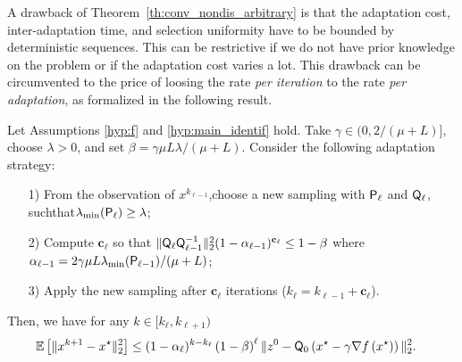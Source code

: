 {
A drawback of Theorem~\ref{th:conv_nondis_arbitrary} is that the adaptation cost, inter-adaptation time, and selection uniformity have to be bounded by deterministic sequences. This can be restrictive if we do not have prior knowledge on the problem or if the adaptation cost varies a lot. 
This drawback can be circumvented to the price of loosing the rate \emph{per iteration} to the rate \emph{per adaptation}, as formalized in the following result.
        

\begin{theorem}\label{th:aggressive}
    Let Assumptions \ref{hyp:f} and  \ref{hyp:main_identif} hold. Take $\gamma\in(0,2/(\mu+L)]$, choose $\lambda>0$, and set $\beta = \gamma\mu L\lambda/(\mu+L)$. Consider the following adaptation strategy:
    \begin{itemize}
        \item[1)] From the observation of $x^{k_{\ell-1}}$\!,\;choose a new sampling with ${\mathsf{P}}_{\ell}$ and ${\mathsf{Q}}_\ell$,\,such\;that\;$\lambda_{ \min}({\mathsf{P}}_{\ell}) \geq \lambda$;
        \item[2)] Compute $\mathbf{c}_\ell$ so that $\|  {\mathsf{Q}}_\ell   {\mathsf{Q}}_{\ell-1}^{-1} \|_2^2 (1-\alpha_{\ell-1})^{\mathbf{c}_\ell} \leq 1 - \beta$ where $\alpha_{\ell-1} = 2\gamma \mu L \lambda_{ \min}({\mathsf{P}}_{\ell-1})/(\mu + L)$;
        \item[3)] Apply the new sampling %
        after $\mathbf{c}_\ell$ iterations ($k_{\ell} = k_{\ell-1}+\mathbf{c}_\ell$).
    \end{itemize}
    Then, we have for any $k\in [k_\ell,k_{\ell+1})$
    \begin{align*}
        \mathbb{E}\left[\|x^{k+1}-x^\star\|_2^2\right] &\leq (1-\alpha_\ell)^{k-k_\ell}  \left(1-\beta\right)^{\ell}  \|z^{0}-{\mathsf{Q}}_0\left(x^\star - \gamma\nabla f\left(x^\star\right)\right)\|_2^2. 
    \end{align*}
    \end{theorem}

}
